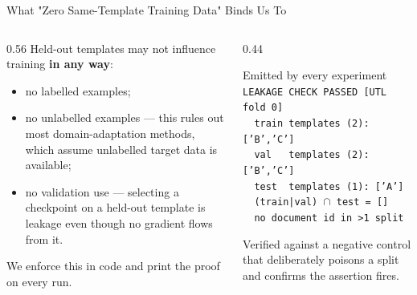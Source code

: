 \documentclass[aspectratio=169, 11pt]{beamer}
\begin{document}
\begin{frame}{What "Zero Same-Template Training Data" Binds Us To}
  \begin{columns}[T]
    \begin{column}{0.56\textwidth}
      Held-out templates may not influence training \textbf{in any way}:
      \begin{itemize}
        \item no labelled examples;
        \item \alert{no unlabelled examples} — this rules out most domain-adaptation methods, which assume unlabelled target data is available;
        \item \alert{no validation use} — selecting a checkpoint on a held-out template is leakage even though no gradient flows from it.
      \end{itemize}
      \medskip
      We enforce this in code and print the proof on every run.
    \end{column}
    \begin{column}{0.44\textwidth}
      \scriptsize
      \begin{block}{\scriptsize Emitted by every experiment}
\texttt{LEAKAGE CHECK PASSED [UTL fold 0]}\\
\texttt{~~train templates (2): ['B','C']}\\
\texttt{~~val~~~templates (2): ['B','C']}\\
\texttt{~~test~~templates (1): ['A']}\\
\texttt{~~(train|val) $\cap$ test = []}\\
\texttt{~~no document id in >1 split}
      \end{block}
      {\color{muted} Verified against a negative control that deliberately poisons a split and confirms the assertion fires.}
    \end{column}
  \end{columns}
\end{frame}
\end{document}
